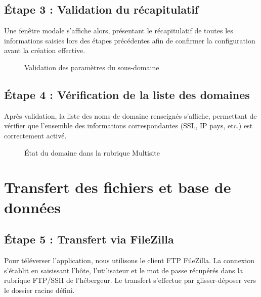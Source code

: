 \subsection{Étape 3 : Validation du récapitulatif}
Une fenêtre modale s'affiche alors, présentant le récapitulatif de toutes les informations saisies lors des étapes précédentes afin de confirmer la configuration avant la création effective.

\begin{figure}[H]
    \centering
    \caption{Validation des paramètres du sous-domaine}
\end{figure}

\subsection{Étape 4 : Vérification de la liste des domaines}
Après validation, la liste des noms de domaine renseignés s'affiche, permettant de vérifier que l'ensemble des informations correspondantes (SSL, IP pays, etc.) est correctement activé.

\begin{figure}[H]
    \centering
    \caption{État du domaine dans la rubrique Multisite}
\end{figure}

\section{Transfert des fichiers et base de données}

\subsection{Étape 5 : Transfert via FileZilla}
Pour téléverser l'application, nous utilisons le client FTP FileZilla. La connexion s'établit en saisissant l'hôte, l'utilisateur et le mot de passe récupérés dans la rubrique FTP/SSH de l'hébergeur. Le transfert s'effectue par glisser-déposer vers le dossier racine défini.

